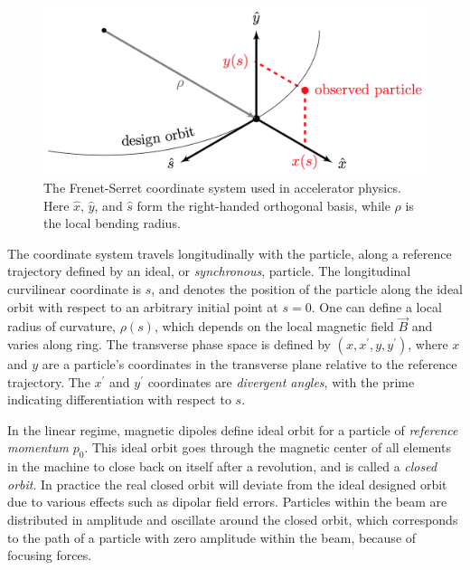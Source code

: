 \begin{figure}[!htb]
    \begin{center}
    \includegraphics[width = 0.8\linewidth]{Figures/Chapter2/Frenet_Serret_Coordinate_System.png}
    \caption{The Frenet-Serret coordinate system used in accelerator physics. Here \(\hat{x}\), \(\hat{y}\), and \(\hat{s}\) form the right-handed orthogonal basis, while \(\rho\) is the local bending radius.}
    \label{figure:frenet_serret_system}
    \end{center}
\end{figure}

The coordinate system travels longitudinally with the particle, along a reference trajectory defined by an ideal, or \emph{synchronous}, particle.
The longitudinal curvilinear coordinate is \(s\), and denotes the position of the particle along the ideal orbit with respect to an arbitrary initial point at \(s = 0\).
One can define a local radius of curvature, \(\rho(s)\), which depends on the local magnetic field \(\vec{B}\) and varies along ring.
The transverse phase space is defined by \((x, x^{\prime}, y, y^{\prime})\), where \(x\) and \(y\) are a particle's coordinates in the transverse plane relative to the reference trajectory.
The \(x^{\prime}\) and \(y^{\prime}\) coordinates are \emph{divergent angles}, with the prime indicating differentiation with respect to \(s\).
\bigbreak

In the linear regime, magnetic dipoles define ideal orbit for a particle of \emph{reference momentum} \(p_0\).
This ideal orbit goes through the magnetic center of all elements in the machine to close back on itself after a revolution, and is called a \emph{closed orbit}.
In practice the real closed orbit will deviate from the ideal designed orbit due to various effects such as dipolar field errors.
Particles within the beam are distributed in amplitude and oscillate around the closed orbit, which corresponds to the path of a particle with zero amplitude within the beam, because of focusing forces. 
\bigbreak

